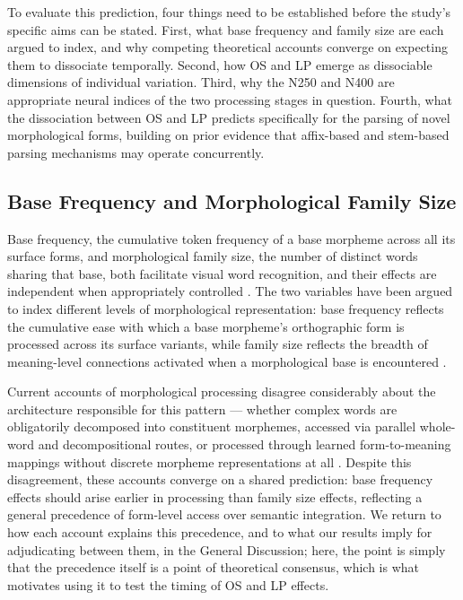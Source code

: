 	To evaluate this prediction, four things need to be established before the study's specific aims can be stated. First, what base frequency and family size are each argued to index, and why competing theoretical accounts converge on expecting them to dissociate temporally. Second, how OS and LP emerge as dissociable dimensions of individual variation. Third, why the N250 and N400 are appropriate neural indices of the two processing stages in question. Fourth, what the dissociation between OS and LP predicts specifically for the parsing of novel morphological forms, building on prior evidence that affix-based and stem-based parsing mechanisms may operate concurrently.

	\subsection{Base Frequency and Morphological Family Size}

	Base frequency, the cumulative token frequency of a base morpheme across all its surface forms, and morphological family size, the number of distinct words sharing that base, both facilitate visual word recognition, and their effects are independent when appropriately controlled \citep{fordDerivationalMorphologyBase2010}. The two variables have been argued to index different levels of morphological representation: base frequency reflects the cumulative ease with which a base morpheme's orthographic form is processed across its surface variants, while family size reflects the breadth of meaning-level connections activated when a morphological base is encountered \citep{schreuderHowComplexSimplex1997, taftMorphologicalDecompositionReverse2004, taftRecognitionAffixedWords1979, dejongMorphologicalFamilySize2000, bertramEffectsFamilySize2000}.

	Current accounts of morphological processing disagree considerably about the architecture responsible for this pattern --- whether complex words are obligatorily decomposed into constituent morphemes, accessed via parallel whole-word and decompositional routes, or processed through learned form-to-meaning mappings without discrete morpheme representations at all \citep{schreuderModelingMorphologicalProcessing1995, dejongMorphologicalFamilySize2000, taft_lexical_1975, taftMorphologicalDecompositionReverse2004, rastleMorphologicalDecompositionBased2008, longtinMorphologicalDecompositionEarly2005, morrisSemanticTransparencyMasked2007, chuangDiscriminativeLearningLexicon}. Despite this disagreement, these accounts converge on a shared prediction: base frequency effects should arise earlier in processing than family size effects, reflecting a general precedence of form-level access over semantic integration. We return to how each account explains this precedence, and to what our results imply for adjudicating between them, in the General Discussion; here, the point is simply that the precedence itself is a point of theoretical consensus, which is what motivates using it to test the timing of OS and LP effects.

